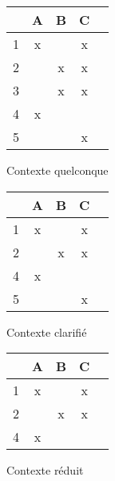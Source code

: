 \begin{figure}[H]
	\begin{minipage}[t]{0.3\textwidth}
	\begin{center}
		\begin{tabular}{ l | c c c c }
			 & A & B & C \\
			\hline
			1 & x &  & x \\
			2 &  & x & x \\
			3 &  & x & x \\
			4 & x &  &  \\
			5 &  &  & x \\
		\end{tabular}
		\caption{Contexte quelconque}
		\label{contexte_quelconque}
	\end{center}
	\end{minipage}
	\begin{minipage}[t]{0.3\textwidth}
	\begin{center}
		\begin{tabular}{ l | c c c c }
			 & A & B & C \\
			\hline
			1 & x &  & x \\
			2 &  & x & x \\
			4 & x &  &  \\
			5 &  &  & x \\
		\end{tabular}
		\caption{Contexte clarifié}
		\label{contexte_clarifié}
	\end{center}
	\end{minipage}
	\begin{minipage}[t]{0.3\textwidth}
	\begin{center}
		\begin{tabular}{ l | c c c c }
			 & A & B & C \\
			\hline
			1 & x &  & x \\
			2 &  & x & x \\
			4 & x &  &  \\
		\end{tabular}
		\caption{Contexte réduit}
		\label{contexte_réduit}
	\end{center}
	\end{minipage}
\end{figure}



